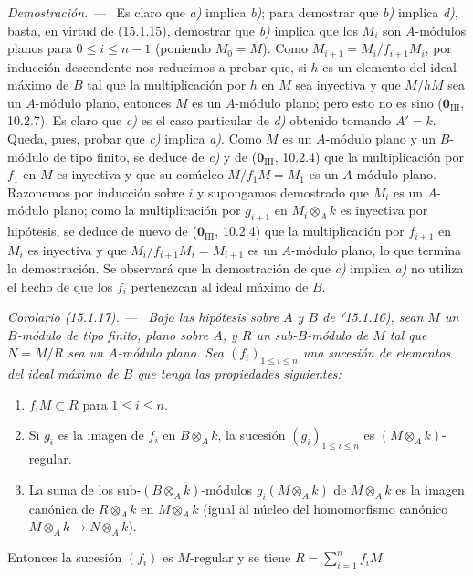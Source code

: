 \documentclass[10pt,oneside]{book}
\makeatletter
\newcommand{\setmanualcurrentlabel}[1]{\def\@currentlabel{#1}}
\newenvironment{corollary}[1][]{%
  \setmanualcurrentlabel{#1}\par\medskip\noindent\itshape Corolario (#1). ---\ }{\par}
\newenvironment{proof}{%
  \par\medskip\noindent\textit{Demostración. ---\ }}{\par}
\makeatother
\begin{document}
\begin{proof}
Es claro que \emph{a)} implica \emph{b)}; para demostrar que \emph{b)} implica \emph{d)}, basta, en virtud
de (15.1.15), demostrar que \emph{b)} implica que los $M_i$ son $A$-módulos planos
para $0\leq i\leq n-1$ (poniendo $M_0=M$). Como
$M_{i+1}=M_i/f_{i+1}M_i$, por inducción descendente nos reducimos a probar que,
si $h$ es un elemento del ideal máximo de $B$ tal que la multiplicación por
$h$ en $M$ sea inyectiva y que $M/hM$ sea un $A$-módulo plano, entonces $M$
es un $A$-módulo plano; pero esto no es sino
($\mathbf{0}_{\mathrm{III}}$, 10.2.7). Es claro que \emph{c)} es el caso particular de \emph{d)}
obtenido tomando $A'=k$. Queda, pues, probar que \emph{c)} implica \emph{a)}. Como $M$ es un
$A$-módulo plano y un $B$-módulo de tipo finito, se deduce de \emph{c)} y de
($\mathbf{0}_{\mathrm{III}}$, 10.2.4) que la multiplicación por $f_1$ en $M$ es
inyectiva y que su conúcleo $M/f_1M=M_1$ es un $A$-módulo plano. Razonemos por
inducción sobre $i$ y supongamos demostrado que $M_i$ es un $A$-módulo plano;
como la multiplicación por $g_{i+1}$ en $M_i\otimes_A k$ es inyectiva por
hipótesis, se deduce de nuevo de ($\mathbf{0}_{\mathrm{III}}$, 10.2.4) que la
multiplicación por $f_{i+1}$ en $M_i$ es inyectiva y que
$M_i/f_{i+1}M_i=M_{i+1}$ es un $A$-módulo plano, lo que termina la
demostración. Se observará que la demostración de que \emph{c)} implica \emph{a)} no utiliza
el hecho de que los $f_i$ pertenezcan al ideal máximo de $B$.
\end{proof}

\begin{corollary}[15.1.17]
\label{0.15.1.17-es}
Bajo las hipótesis sobre $A$ y $B$ de \textup{(15.1.16)}, sean $M$ un $B$-módulo de
tipo finito, plano sobre $A$, y $R$ un sub-$B$-módulo de $M$ tal que $N=M/R$
sea un $A$-módulo plano. Sea $(f_i)_{1\leq i\leq n}$ una sucesión de elementos
del ideal máximo de $B$ que tenga las propiedades siguientes:
\begin{enumerate}
  \item[\textup{(i)}] $f_iM\subset R$ para $1\leq i\leq n$.
  \item[\textup{(ii)}] Si $g_i$ es la imagen de $f_i$ en $B\otimes_A k$, la sucesión
  $(g_i)_{1\leq i\leq n}$ es $(M\otimes_A k)$-regular.
  \item[\textup{(iii)}] La suma de los sub-$(B\otimes_A k)$-módulos
  $g_i(M\otimes_A k)$ de $M\otimes_A k$ es la imagen canónica de
  $R\otimes_A k$ en $M\otimes_A k$ (igual al núcleo del homomorfismo canónico
  $M\otimes_A k\to N\otimes_A k$).
\end{enumerate}
Entonces la sucesión $(f_i)$ es $M$-regular y se tiene
$R=\sum_{i=1}^n f_iM$.
\end{corollary}
\end{document}
